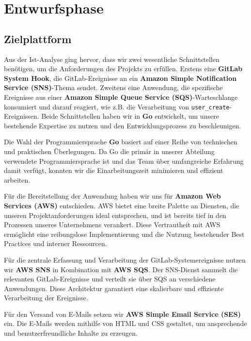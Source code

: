 \section{Entwurfsphase} 
\label{sec:Entwurfsphase}

\subsection{Zielplattform}
\label{sec:Zielplattform}

Aus der Ist-Analyse ging hervor, dass wir zwei wesentliche Schnittstellen benötigen, um die Anforderungen des Projekts zu erfüllen. Erstens eine \textbf{GitLab System Hook}, die GitLab-Ereignisse an ein \textbf{Amazon Simple Notification Service (SNS)}-Thema sendet. Zweitens eine Anwendung, die spezifische Ereignisse aus einer \textbf{Amazon Simple Queue Service (SQS)}-Warteschlange konsumiert und darauf reagiert, wie z.B. die Verarbeitung von \texttt{user\_create}-Ereignissen. Beide Schnittstellen haben wir in \textbf{Go} entwickelt, um unsere bestehende Expertise zu nutzen und den Entwicklungsprozess zu beschleunigen.

Die Wahl der Programmiersprache \textbf{Go} basiert auf einer Reihe von technischen und praktischen Überlegungen. Da Go die primär in unserer Abteilung verwendete Programmiersprache ist und das Team über umfangreiche Erfahrung damit verfügt, konnten wir die Einarbeitungszeit minimieren und effizient arbeiten.

Für die Bereitstellung der Anwendung haben wir uns für \textbf{Amazon Web Services (AWS)} entschieden. AWS bietet eine breite Palette an Diensten, die unseren Projektanforderungen ideal entsprechen, und ist bereits tief in den Prozessen unseres Unternehmens verankert. Diese Vertrautheit mit AWS ermöglicht eine reibungslose Implementierung und die Nutzung bestehender Best Practices und interner Ressourcen.

Für die zentrale Erfassung und Verarbeitung der GitLab-Systemereignisse nutzen wir \textbf{AWS SNS} in Kombination mit \textbf{AWS SQS}. Der SNS-Dienst sammelt die relevanten GitLab-Ereignisse und verteilt sie über SQS an verschiedene Anwendungen. Diese Architektur garantiert eine skalierbare und effiziente Verarbeitung der Ereignisse.

Für den Versand von E-Mails setzen wir \textbf{AWS Simple Email Service (SES)} ein. Die E-Mails werden mithilfe von HTML und CSS gestaltet, um ansprechende und benutzerfreundliche Inhalte zu erzeugen.

